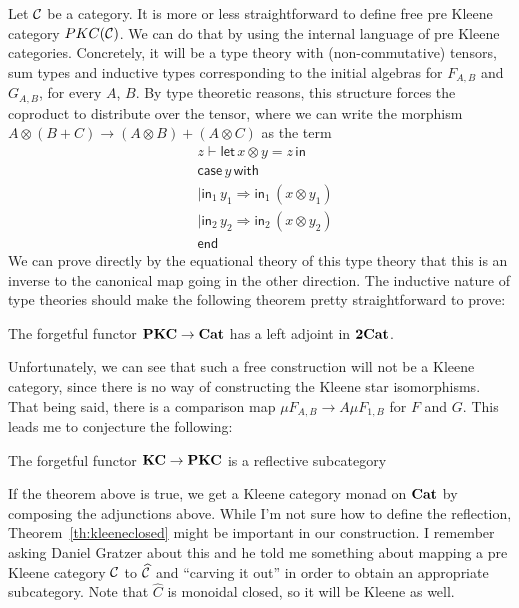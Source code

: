 \documentclass[acmsmall,anonymous,review,screen]{acmart}
\newcommand{\cat}[1]{
  \relax
  \StrLen{#1}[\arglength]
  \ifnum\arglength=1
  \mathcal{#1}
  \else
  \mathbf{#1}
  \fi
}
\begin{document}
Let $\cat{C}$ be a category. It is more or less straightforward to
define free pre Kleene category $PKC(\cat{C})$. We can do that by
using the internal language of pre Kleene categories. Concretely, it
will be a type theory with (non-commutative) tensors, sum types and
inductive types corresponding to the initial algebras for $F_{A, B}$
and $G_{A, B}$, for every $A$, $B$. By type theoretic reasons, this
structure forces the coproduct to distribute over the tensor, where we
can write the morphism $A \otimes (B + C) \to (A \otimes B) + (A
\otimes C) $ as the term
\begin{align*}
  &z \vdash \mathsf{let}\, x \otimes y = z\, \mathsf{in}\\
  &\mathsf{case}\, y \, \mathsf{with}\\
  &| \mathsf{in}_1\, y_1 \Rightarrow \mathsf{in}_1\, (x \otimes y_1)\\
  &| \mathsf{in}_2\,y_2\Rightarrow \mathsf{in}_2 \,(x \otimes y_2)\\
  &\mathsf{end}
\end{align*}
%
We can prove directly by the equational theory of this type theory
that this is an inverse to the canonical map going in the other
direction. The inductive nature of type theories should make the
following theorem pretty straightforward to prove:
%
\begin{theorem}
  The forgetful functor $\cat{PKC} \to \cat{Cat}$ has a left adjoint
  in $\cat{2Cat}$.
\end{theorem}

Unfortunately, we can see that such a free construction will not be a
Kleene category, since there is no way of constructing the Kleene star
isomorphisms. That being said, there is a comparison map
$\mu F_{A,B} \to A \mu F_{1, B}$ for $F$ and $G$. This leads me to conjecture
the following:
%
\begin{conjecture}
  The forgetful functor $\cat{KC} \to \cat{PKC}$ is a reflective
  subcategory
\end{conjecture}

If the theorem above is true, we get a Kleene category
monad on $\cat{Cat}$ by composing the adjunctions above.
While I'm not sure how to define the reflection, Theorem~\ref{th:kleeneclosed}
might be important in our construction. I remember asking Daniel Gratzer
about this and he told me something about mapping a pre Kleene
category $\cat{C}$ to $\widehat{\cat{C}}$ and ``carving it out'' in order
to obtain an appropriate subcategory. Note that $\widehat{C}$ is monoidal
closed, so it will be Kleene as well.
\end{document}

